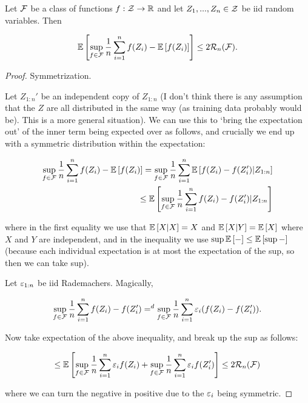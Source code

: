 \documentclass[11pt]{scrartcl}
\begin{document}
\begin{theorem}
    Let $\mathcal{F}$ be a class of functions $f: \mathcal{Z} \rightarrow \mathbb R$ and let $Z_1, ... , Z_n \in \mathcal{Z}$ be iid random variables. Then
    
    \begin{equation}
        \mathbb{E} \left[ \sup_{f \in \mathcal{F}} \frac1n \sum_{i=1}^n f(Z_i) - \mathbb{E} \left[ f(Z_i) \right] \right] \le 2\mathcal{R}_n(\mathcal{F}).
    \end{equation}
    
    \begin{proof}
    Symmetrization.
    
    Let $Z_{1:n}'$ be an independent copy of $Z_{1:n}$ (I don't think there is any assumption that the $Z$ are all distributed in the same way (as training data probably would be). This is a more general situation). We can use this to `bring the expectation out' of the inner term being expected over as follows, and crucially we end up with a symmetric distribution within the expectation:
    
    \begin{align}
        \sup_{f \in \mathcal{F}} \frac1n \sum_{i=1}^n f(Z_i) - \mathbb{E} \left[ f(Z_i) \right] = \sup_{f \in \mathcal{F}} \frac1n \sum_{i=1}^n \mathbb{E} \left[ f(Z_i)  - f(Z_i') | Z_{1:n} \right] \\
        \le \mathbb{E} \left[  \sup_{f \in \mathcal{F}} \frac1n \sum_{i=1}^n f(Z_i)  - f(Z_i') | Z_{1:n} \right] 
    \end{align}

    where in the first equality we use that $\mathbb{E} \left[ X|X \right]=X$ and $\mathbb{E} \left[ X|Y \right]=\mathbb{E} \left[ X \right]$ where $X$ and $Y$ are independent, and in the inequality we use $\sup{\mathbb{E} \left[ - \right]} \le \mathbb{E} \left[ \sup - \right]$ (because each individual expectation is at most the expectation of the sup, so then we can take sup).
    
    Let $\varepsilon_{1:n}$ be iid Rademachers. Magically,
    
    \begin{equation}
        \sup_{f \in \mathcal{F}} \frac1n \sum_{i=1}^n f(Z_i)  - f(Z_i') =^d \sup_{f \in \mathcal{F}} \frac1n \sum_{i=1}^n \varepsilon_i (f(Z_i)  - f(Z_i')).
    \end{equation}
    

    
    
    Now take expectation of the above inequality, and break up the sup as follows:
    
    \begin{align}
        \le \mathbb{E} \left[  \sup_{f \in \mathcal{F}} \frac1n \sum_{i=1}^n \varepsilon_i f(Z_i) + \sup_{f \in \mathcal{F}} \frac1n \sum_{i=1}^n \varepsilon_i f(Z_i') \right] \le 2\mathcal{R}_n(\mathcal{F})
    \end{align}
    
    where we can turn the negative in positive due to the $\varepsilon_i$ being symmetric.
    \end{proof}
\end{theorem}
\end{document}
